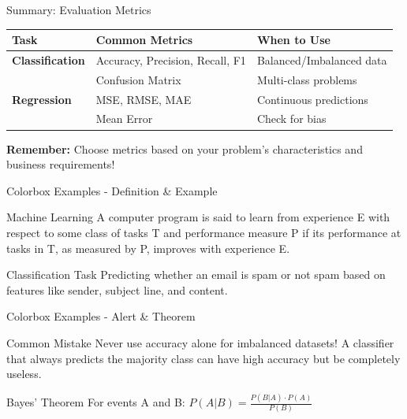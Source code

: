 \documentclass[usenames,dvipsnames]{beamer}
\begin{document}
\begin{frame}{Summary: Evaluation Metrics}
\begin{center}
\begin{tabular}{|l|l|l|}
\hline
\textbf{Task} & \textbf{Common Metrics} & \textbf{When to Use} \\
\hline
\textbf{Classification} & Accuracy, Precision, Recall, F1 & Balanced/Imbalanced data \\
 & Confusion Matrix & Multi-class problems \\
\hline
\textbf{Regression} & MSE, RMSE, MAE & Continuous predictions \\
 & Mean Error & Check for bias \\
\hline
\end{tabular}
\end{center}

\vspace{1cm}
\textbf{Remember:} Choose metrics based on your problem's characteristics and business requirements!
\end{frame}

\begin{frame}{Colorbox Examples - Definition \& Example}
\begin{definitionbox}{Machine Learning}
A computer program is said to learn from experience E with respect to some class of tasks T and performance measure P if its performance at tasks in T, as measured by P, improves with experience E.
\end{definitionbox}

\vspace{0.5cm}

\begin{examplebox}{Classification Task}
Predicting whether an email is spam or not spam based on features like sender, subject line, and content.
\end{examplebox}
\end{frame}

\begin{frame}{Colorbox Examples - Alert \& Theorem}
\begin{alertbox}{Common Mistake}
Never use accuracy alone for imbalanced datasets! A classifier that always predicts the majority class can have high accuracy but be completely useless.
\end{alertbox}

\vspace{0.5cm}

\begin{theorembox}{Bayes' Theorem}
For events A and B: $P(A|B) = \frac{P(B|A) \cdot P(A)}{P(B)}$
\end{theorembox}
\end{frame}
\end{document}
